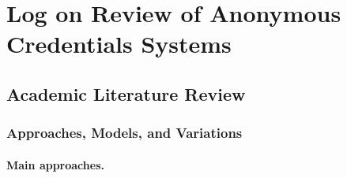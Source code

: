 \section{Log on Review of Anonymous Credentials Systems}
\label{app:ac}

\subsection{Academic Literature Review}

\subsubsection{Approaches, Models, and Variations}

\paragraph{Main approaches.} %

